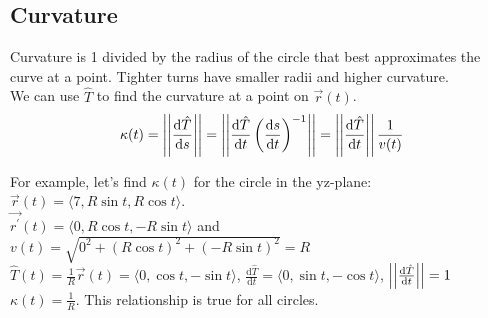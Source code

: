\subsection{Curvature}
Curvature is 1 divided by the radius of the circle that best approximates the curve at a point. Tighter turns have smaller radii and higher curvature.\\
We can use $\hat{T}$ to find the curvature at a point on $\vec{r}(t)$.\\
$$\kappa(t)=\left|\left|\frac{\mathrm{d}\hat{T}}{\mathrm{d}s}\right|\right|=\left|\left|\frac{\mathrm{d}\hat{T}}{\mathrm{d}t}\left(\frac{\mathrm{d}s}{\mathrm{d}t}\right)^{-1}\right|\right|=\left|\left|\frac{\mathrm{d}\hat{T}}{\mathrm{d}t}\right|\right|\frac{1}{v(t)}$$

\noindent
For example, let's find $\kappa(t)$ for the circle in the yz-plane: $\vec{r}(t)=\langle 7, R\sin{t}, R\cos{t} \rangle$.\\
\indent
$\vec{r^\prime}(t)=\langle 0, R\cos{t}, -R\sin{t}\rangle$ and $v(t)=\sqrt{0^2+(R\cos{t})^2+(-R\sin{t})^2}=R$\\
\indent
$\hat{T}(t)=\frac{1}{R}\vec{r}(t)=\langle0,\cos{t},-\sin{t}\rangle$, $\frac{\mathrm{d}\hat{T}}{\mathrm{d}t}=\langle 0,\sin{t},-\cos{t}\rangle$, $\left|\left|\frac{\mathrm{d}\hat{T}}{\mathrm{d}t}\right|\right|=1$\\
\indent
$\kappa(t)=\frac{1}{R}$. This relationship is true for all circles.
